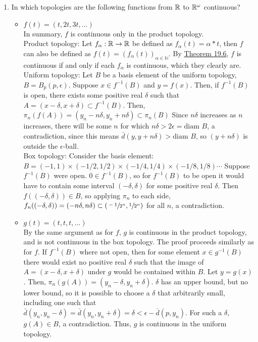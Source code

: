 \documentclass[12pt,letterpaper]{article}
\begin{document}
\begin{enumerate}
  \begin{enumerate}
    \item In which topologies are the following functions from $\mathbb{R}$ to $\mathbb{R}^\omega$ continuous?
    \begin{itemize}
      \item $f(t) = (t,2t,3t,\dots)$\\
      In summary, $f$ is continuous only in the product topology. \\
      Product topology: Let $f_\alpha : \mathbb{R} \rightarrow \mathbb{R}$ be defined as $f_\alpha(t) = \alpha*t$, then $f$ can also be defined as $f(t) = (f_\alpha(t))_{\alpha\in \mathbb{N}}$. By \hyperref[thm:MapsProducts19.6]{Theorem 19.6}, $f$ is continuous if and only if each $f_\alpha$ is continuous, which they clearly are. \\
      Uniform topology: Let $B$ be a basis element of the uniform topology, $B=B_{\bar{p}}(p,\epsilon)$. Suppose $x\in f^{-1}(B)$ and $y=f(x)$. Then, if $f^{-1}(B)$ is open, there exists some positive real $\delta$ such that $A=(x-\delta, x+\delta)\subset f^{-1}(B)$. Then, $\pi_n(f(A)) = (y_n-n\delta, y_n+n\delta) \subset \pi_n(B)$ Since $n\delta$ increases as $n$ increases, there will be some $n$ for which $n\delta > 2\epsilon = \text{diam } B$, a contradiction, since this means $\bar{d}(y, y+n\delta) > \text{diam } B$, so $(y+n\delta)$ is outside the $\epsilon$-ball. \\
      Box topology: Consider the basis element: $B = (-1, 1) \times (-1/2, 1/2) \times (-1/4, 1/4) \times (-1/8, 1/8) \cdots$ Suppose $f^{-1}(B)$ were open. $0\in f^{-1}(B)$, so for $f^{-1}(B)$ to be open it would have to contain some interval $(-\delta, \delta)$ for some positive real $\delta$. Then $f((-\delta, \delta)) \in B$, so applying $\pi_n$ to each side, $f_n((-\delta,\delta)) = (-n\delta, n\delta) \subset (\sfrac{-1}{2^n}, \sfrac{1}{2^n})$ for all $n$, a contradiction.
      \item $g(t) = (t, t, t, \dots)$ \\
      By the same argument as for $f$, $g$ is continuous in the product topology, and is not continuous in the box topology.
      The proof proceeds similarly as for $f$. If $f^{-1}(B)$ where not open, then for some element $x\in g^{-1}(B)$ there would exist no positive real $\delta$ such that the image of $A = (x-\delta, x+\delta)$ under $g$ would be contained within $B$. Let $y=g(x)$. Then, $\pi_n(g(A)) = (y_n - \delta, y_n+\delta)$. $\delta$ has an upper bound, but no lower bound, so it is possible to choose a $\delta$ that arbitrarily small, including one such that $\bar{d}(y_n, y_n-\delta)=\bar{d}(y_n, y_n+\delta)=\delta < \epsilon-\bar{d}(p, y_n)$. For such a $\delta$, $g(A)\in B$, a contradiction. Thus, $g$ is continuous in the uniform topology.

\end{itemize}
\end{enumerate}
\end{enumerate}
\end{document}
